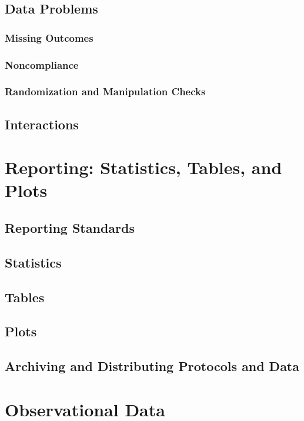 \documentclass[12pt]{article}
\begin{document}
\subsection{Data Problems}
\subsubsection{Missing Outcomes}
\subsubsection{Noncompliance}
\subsubsection{Randomization and Manipulation Checks}

\subsection{Interactions}



\section{Reporting: Statistics, Tables, and Plots}
\subsection{Reporting Standards}

\subsection{Statistics}

\subsection{Tables}

\subsection{Plots}

\subsection{Archiving and Distributing Protocols and Data}




\section{Observational Data}
\end{document}
